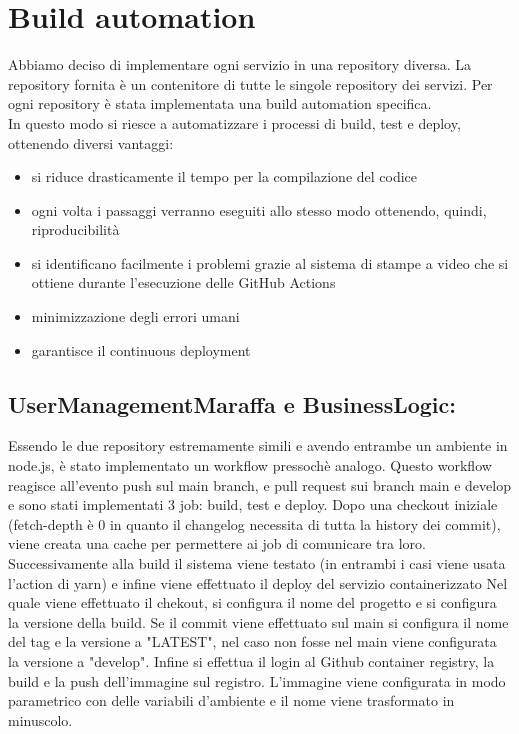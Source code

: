 \section{Build automation}
Abbiamo deciso di implementare ogni servizio in una repository diversa. La repository fornita è un contenitore di tutte le singole repository dei servizi.
Per ogni repository è stata implementata una build automation specifica. \\
In questo modo si riesce a automatizzare i processi di build, test e deploy, ottenendo diversi vantaggi:
\begin{itemize}
    \item si riduce drasticamente il tempo per la compilazione del codice
    \item ogni volta i passaggi verranno eseguiti allo stesso modo ottenendo, quindi, riproducibilità
    \item si identificano facilmente i problemi grazie al sistema di stampe a video che si ottiene durante l'esecuzione delle GitHub Actions
    \item minimizzazione degli errori umani
    \item garantisce il continuous deployment 
\end{itemize}


\subsection{UserManagementMaraffa e BusinessLogic:} Essendo le due repository estremamente simili e avendo entrambe un ambiente in node.js, è stato implementato un workflow pressochè analogo. Questo workflow reagisce all'evento push sul main branch, e pull request sui branch main e develop 
e sono stati implementati 3 job: build, test e deploy.
Dopo una checkout iniziale (fetch-depth è 0 in quanto il changelog necessita di tutta la history dei commit),
 viene creata una cache per permettere ai job di comunicare tra loro. Successivamente alla build il sistema viene testato
  (in entrambi i casi viene usata l'action di yarn) e infine viene effettuato il deploy del servizio containerizzato
 Nel quale viene effettuato il chekout, si configura il nome del progetto e si configura la versione della build.
 Se il commit viene effettuato sul main si configura il nome del tag e la versione a "LATEST", nel caso non fosse nel main viene configurata la versione a "develop".
  Infine si effettua il login al Github container registry, la build e la push dell'immagine sul registro. L'immagine viene configurata in modo parametrico con delle variabili d'ambiente e il nome viene trasformato in minuscolo. 

